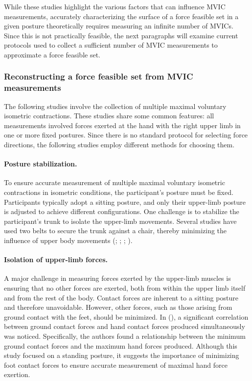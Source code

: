 While these studies highlight the various factors that can influence MVIC measurements, accurately characterizing the surface of a force feasible set in a given posture theoretically requires measuring an infinite number of MVICs. Since this is not practically feasible, the next paragraphs will examine current protocols used to collect a sufficient number of MVIC measurements to approximate a force feasible set.

\subsubsection*{Reconstructing a force feasible set from MVIC measurements}
\label{subsec:reconstruction_from_mvic}
The following studies involve the collection of multiple maximal voluntary isometric contractions. These studies share some common features: all measurements involved forces exerted at the hand with the right upper limb in one or more fixed postures. Since there is no standard protocol for selecting force directions, the following studies employ different methods for choosing them.

\paragraph*{Posture stabilization.} To ensure accurate measurement of multiple maximal voluntary isometric contractions in isometric conditions, the participant's posture must be fixed. Participants typically adopt a sitting posture, and only their upper-limb posture is adjusted to achieve different configurations. One challenge is to stabilize the participant's trunk to isolate the upper-limb movements. Several studies have used two belts to secure the trunk against a chair, thereby minimizing the influence of upper body movements (\cite{oshimaRoboticAnalysesOutput2000}; \cite{sasakiHigherDimensionalSpatial2010a}; \cite{hernandezHumanUpperlimbForce2016a}; \cite{rezzougUpperLimbIsometricForce2021b}).

\paragraph*{Isolation of upper-limb forces.} A major challenge in measuring forces exerted by the upper-limb muscles is ensuring that no other forces are exerted, both from within the upper limb itself and from the rest of the body. Contact forces are inherent to a sitting posture and therefore unavoidable. However, other forces, such as those arising from ground contact with the feet, should be minimized. In (\cite{leeBiomechanicalAnalysisCoordinated2023}), a significant correlation between ground contact forces and hand contact forces produced simultaneously was noticed. Specifically, the authors found a relationship between the minimum ground contact forces and the maximum hand forces produced. Although this study focused on a standing posture, it suggests the importance of minimizing foot contact forces to ensure accurate measurement of maximal hand force exertion.


